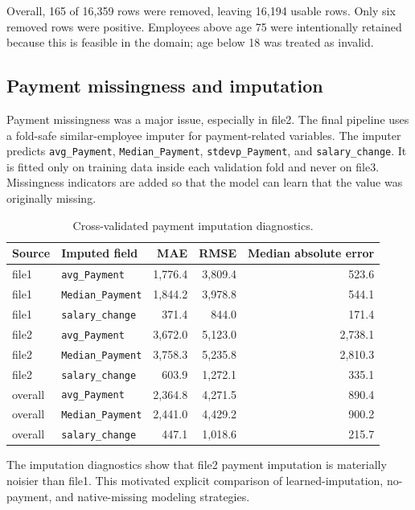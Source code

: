 \documentclass[11pt]{article}
\newcommand{\feature}[1]{\texttt{#1}}
\begin{document}
Overall, 165 of 16,359 rows were removed, leaving 16,194 usable rows. Only six removed rows were positive. Employees above age 75 were intentionally retained because this is feasible in the domain; age below 18 was treated as invalid.

\subsection{Payment missingness and imputation}

Payment missingness was a major issue, especially in file2. The final pipeline uses a fold-safe similar-employee imputer for payment-related variables. The imputer predicts \feature{avg\_Payment}, \feature{Median\_Payment}, \feature{stdevp\_Payment}, and \feature{salary\_change}. It is fitted only on training data inside each validation fold and never on file3. Missingness indicators are added so that the model can learn that the value was originally missing.

\begin{table}[H]
\centering
\caption{Cross-validated payment imputation diagnostics.}
\begin{tabular}{llrrr}
\toprule
Source & Imputed field & MAE & RMSE & Median absolute error \\
\midrule
file1 & \feature{avg\_Payment} & 1,776.4 & 3,809.4 & 523.6 \\
file1 & \feature{Median\_Payment} & 1,844.2 & 3,978.8 & 544.1 \\
file1 & \feature{salary\_change} & 371.4 & 844.0 & 171.4 \\
file2 & \feature{avg\_Payment} & 3,672.0 & 5,123.0 & 2,738.1 \\
file2 & \feature{Median\_Payment} & 3,758.3 & 5,235.8 & 2,810.3 \\
file2 & \feature{salary\_change} & 603.9 & 1,272.1 & 335.1 \\
overall & \feature{avg\_Payment} & 2,364.8 & 4,271.5 & 890.4 \\
overall & \feature{Median\_Payment} & 2,441.0 & 4,429.2 & 900.2 \\
overall & \feature{salary\_change} & 447.1 & 1,018.6 & 215.7 \\
\bottomrule
\end{tabular}
\end{table}

The imputation diagnostics show that file2 payment imputation is materially noisier than file1. This motivated explicit comparison of learned-imputation, no-payment, and native-missing modeling strategies.
\end{document}
